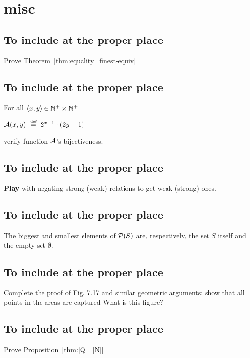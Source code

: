 

\section{misc}


\subsection{To include at the proper place}

Prove Theorem~\ref{thm:equality=finest-equiv}

\subsection{To include at the proper place}

For all $\langle x,y \rangle \in \mathbb{N}^+ \times \mathbb{N}^+$

$\mbox{$\cal A$}(x,y) \ \stackrel{\mbox{{\tiny def}}}{=} \ 2^{x-1} \cdot (2y -1)$

verify function $\mbox{$\cal A$}$'s
bijectiveness.


\subsection{To include at the proper place}

\textbf{ Play} with negating strong (weak) relations to get weak (strong) ones.

 
\subsection{To include at the proper place}

 The biggest and smallest elements of
${\cal P}(S)$ are, respectively, the set $S$ itself and the empty set
$\emptyset$.


\subsection{To include at the proper place}

Complete the proof of Fig. 7.17 and similar geometric arguments: show
that all points in the areas are captured
{\Denis What is this figure?}


\subsection{To include at the proper place}

Prove Proposition~\ref{thm:|Q|=|N|}

